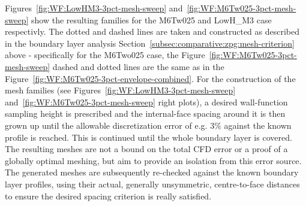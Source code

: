 Figures~\ref{fig:WF:LowHM3-3pct-mesh-sweep} and~\ref{fig:WF:M6Tw025-3pct-mesh-sweep} show the resulting families for the M6Tw025 and LowH\_M3 case respectivly. The dotted and dashed lines are taken and constructed as described in the boundary layer analysis Section~\ref{subsec:comparative:zpg:mesh-criterion} above - specifically for the M6Two025 case, the Figure~\ref{fig:WF:M6Tw025-3pct-mesh-sweep} dashed and dotted lines are the same as in the Figure~\ref{fig:WF:M6Tw025-3pct-envelope-combined}. For the construction of the mesh families (see Figures~\ref{fig:WF:LowHM3-3pct-mesh-sweep} and~\ref{fig:WF:M6Tw025-3pct-mesh-sweep} right plots), a desired wall-function sampling height is prescribed and the internal-face spacing around it is then grown up until the allowable  discretization error of e.g. $3\%$ against the known profile is reached. This is continued until the whole boundary layer is covered. The resulting meshes are not a bound on the total CFD error or a proof of a globally optimal meshing, but aim to provide an isolation from this error source. The generated meshes are subsequently re-checked against the known boundary layer profiles, using their actual, generally unsymmetric, centre-to-face distances to ensure the desired spacing criterion is really satisfied.

